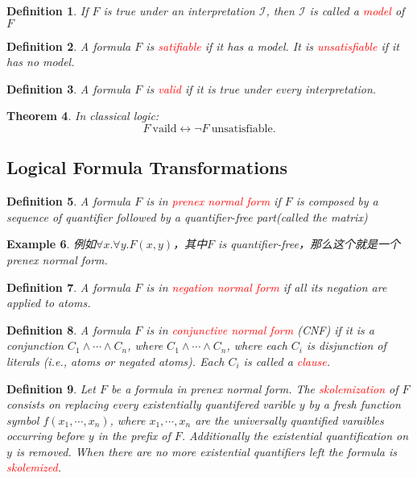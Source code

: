 \documentclass{article}
\theoremstyle{plain}
\newtheorem{theorem}{Theorem}
\newtheorem{example}[theorem]{Example}
\newtheorem{definition}[theorem]{Definition}
\theoremstyle{nonumberplain}
\newcommand{\redt}[1]{\textcolor{red}{#1}}
\begin{document}
\begin{definition}
\rm If $F$ is true under an interpretation $\mathcal{I}$, then $\mathcal{I}$ is called a \redt{model} of $F$
\end{definition}

\begin{definition}
\rm A formula $F$ is \redt{satifiable} if it has a model. It is \redt{unsatisfiable} if it has no model.
\end{definition}

\begin{definition}
\rm A formula $F$ is \redt{valid} if it is true under every interpretation.
\end{definition}

\begin{theorem}\label{vaild-and-unsat}
\rm In classical logic:
\[
	F~\text{vaild} \leftrightarrow \neg F ~\text{unsatisfiable}.
\]
\end{theorem}


\newpage
\subsection{Logical Formula Transformations}

\begin{definition}
\rm A formula $F$ is in \redt{prenex normal form} if $F$ is composed by a sequence of quantifier followed by a quantifier-free part(called the matrix)
\end{definition}

\begin{example}
\rm 例如$\forall x.\forall y. F(x,y)$，其中$F$ is quantifier-free，那么这个就是一个prenex normal form.
\end{example}

\begin{definition}
\rm A formula $F$ is in \redt{negation normal form} if all its negation are applied to atoms.
\end{definition}

\begin{definition}
\rm A formula $F$ is in \redt{conjunctive normal form} (CNF) if it is a conjunction $C_1 \wedge \cdots \wedge C_n$, where $C_1 \wedge \cdots \wedge C_n$, where each $C_i$ is disjunction of literals (i.e., atoms or negated atoms). Each $C_i$ is called a \redt{clause}.
\end{definition}

\begin{definition}
\rm Let $F$ be a formula in prenex normal form. The \redt{skolemization} of $F$ consists on replacing every existentially  quantifered varible $y$ by a fresh function symbol $f(x_1,\cdots,x_n)$, where $x_1, \cdots, x_n$ are the universally quantified varaibles occurring before $y$ in the prefix of $F$. Additionally the existential quantification on $y$ is removed. When there are no more existential quantifiers left the formula is \redt{skolemized}.
\end{definition}
\end{document}
